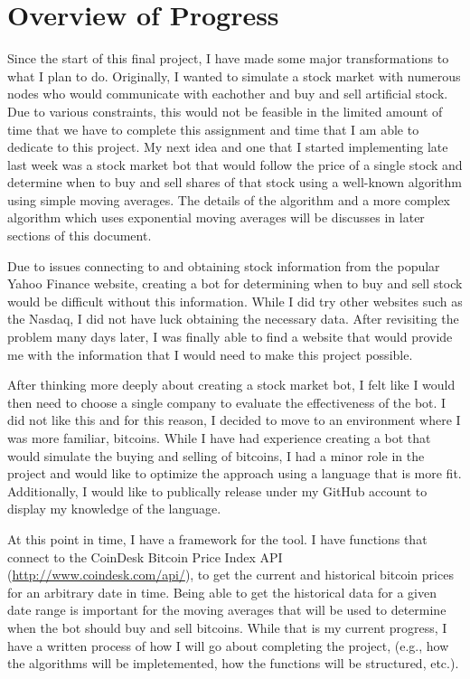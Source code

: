 



\MYTITLE{}
\MYHEADERS{}
\PLEDGE{}


\section{Overview of Progress}

Since the start of this final project, I have made some major transformations to what I plan to do.
Originally, I wanted to simulate a stock market with numerous nodes who would communicate with eachother
and buy and sell artificial stock. Due to various constraints, this would not be feasible in the
limited amount of time that we have to complete this assignment and time that I am able to dedicate
to this project. My next idea and one that I started implementing late last week was a stock market
bot that would follow the price of a single stock and determine when to buy and sell shares of that
stock using a well-known algorithm using simple moving averages. The details of the algorithm and
a more complex algorithm which uses exponential moving averages will be discusses in later sections
of this document.

Due to issues connecting to and obtaining stock information from the popular Yahoo Finance website,
creating a bot for determining when to buy and sell stock would be difficult without this information.
While I did try other websites such as the Nasdaq, I did not have luck obtaining the necessary data.
After revisiting the problem many days later, I was finally able to find a website that would provide
me with the information that I would need to make this project possible.

After thinking more deeply about creating a stock market bot, I felt like I would then need to choose
a single company to evaluate the effectiveness of the bot. I did not like this and for this reason,
I decided to move to an environment where I was more familiar, bitcoins. While I have had experience
creating a bot that would simulate the buying and selling of bitcoins, I had a minor role in the
project and would like to optimize the approach using a language that is more fit. Additionally,
I would like to publically release under my GitHub account to display my knowledge of the language.

At this point in time, I have a framework for the tool. I have functions that connect to the CoinDesk
Bitcoin Price Index API (\url{http://www.coindesk.com/api/}), to get the current and historical bitcoin
prices for an arbitrary date in time. Being able to get the historical data for a given date range
is important for the moving averages that will be used to determine when the bot should buy and sell
bitcoins. While that is my current progress, I have a written process of how I will go about completing
the project, (e.g., how the algorithms will be impletemented, how the functions will be structured, etc.).


